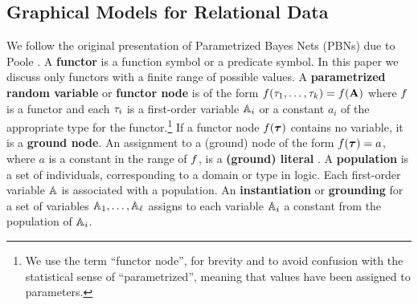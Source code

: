 \documentclass[twoside,leqno,twocolumn]{article}
\begin{document}
\subsection{Graphical Models for Relational Data} \label{sec:graph-relational}
We follow the original presentation of Parametrized Bayes Nets (PBNs) due to Poole \cite{Poole2003}. A \textbf{functor} is a function symbol or a predicate symbol. In this paper we discuss only  functors with a finite range of possible values. 
A \textbf{parametrized random variable} or \textbf{functor node} is  of the form $f(\tau_{1},\ldots,\tau_{k}) = f(\mathbf{A})$ where $f$ is a functor and each $\tau_{i}$ is a first-order variable $\mathbb{A}_{i}$ or a constant $a_{i}$ of the appropriate type for the functor.\footnote{We use the term ``functor node'',  for brevity and to avoid confusion with the statistical sense of ``parametrized'', meaning that values have been assigned to parameters.} 
If a functor node $f(\boldsymbol{\tau})$ contains no variable, it is a \textbf{ground node}. An assignment to a (ground) node of the form $f(\boldsymbol{\tau}) = a$, where $a$ is a constant in the range of $f$, is a \textbf{(ground) literal} \cite{Chiang2012}. 
A \textbf{population} is a set of individuals, corresponding to a domain or type in logic. Each first-order variable $\mathbb{A}$ is associated with a population.
 An \textbf{instantiation} or \textbf{grounding} 
 for a set of variables $\mathbb{A}_{1},\ldots,\mathbb{A}_{\ell}$ assigns to each variable $\mathbb{A}_{i}$ a constant 
 from the population of $\mathbb{A}_{i}$.
\end{document}
